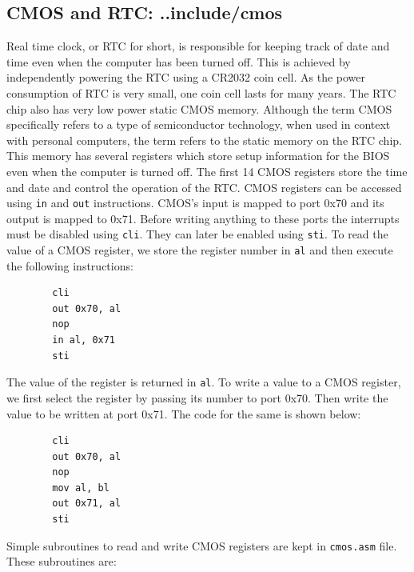 \subsection{CMOS and RTC: ..include/cmos}
Real time clock, or RTC for short, is responsible for keeping track of date and time even when the computer has been turned off. This is achieved by independently powering the RTC using a CR2032 coin cell. As the power consumption of RTC is very small, one coin cell lasts for many years. The RTC chip also has very low power static CMOS memory. Although the term CMOS specifically refers to a type of semiconductor technology, when used in context with personal computers, the term refers to the static memory on the RTC chip. This memory has several registers which store setup information for the BIOS even when the computer is turned off. The first 14 CMOS registers store the time and date and control the operation of the RTC. CMOS registers can be accessed using \verb|in| and \verb|out| instructions. CMOS's input is mapped to port 0x70 and its output is mapped to 0x71. Before writing anything to these ports the interrupts must be disabled using \verb|cli|. They can later be enabled using \verb|sti|. To read the value of a CMOS register, we store the register number in \verb|al| and then execute the following instructions:
\begin{Verbatim}
        cli
        out 0x70, al
        nop
        in al, 0x71
        sti
\end{Verbatim}
The value of the register is returned in \verb|al|. To write a value to a CMOS register, we first select the register by passing its number to port 0x70. Then write the value to be written at port 0x71. The code for the same is shown below:
\begin{Verbatim}
        cli
        out 0x70, al
        nop
        mov al, bl 
        out 0x71, al
        sti
\end{Verbatim}
Simple subroutines to read and write CMOS registers are kept in \texttt{cmos.asm} file. These subroutines are:
